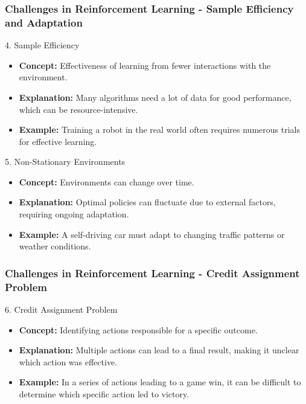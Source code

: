 \documentclass[aspectratio=169]{beamer}
\begin{document}
\begin{frame}[fragile]
    \frametitle{Challenges in Reinforcement Learning - Sample Efficiency and Adaptation}
    \begin{block}{4. Sample Efficiency}
        \begin{itemize}
            \item \textbf{Concept:} Effectiveness of learning from fewer interactions with the environment.
            \item \textbf{Explanation:} Many algorithms need a lot of data for good performance, which can be resource-intensive.
            \item \textbf{Example:} Training a robot in the real world often requires numerous trials for effective learning.
        \end{itemize}
    \end{block}

    \begin{block}{5. Non-Stationary Environments}
        \begin{itemize}
            \item \textbf{Concept:} Environments can change over time.
            \item \textbf{Explanation:} Optimal policies can fluctuate due to external factors, requiring ongoing adaptation.
            \item \textbf{Example:} A self-driving car must adapt to changing traffic patterns or weather conditions.
        \end{itemize}
    \end{block}
\end{frame}

\begin{frame}[fragile]
    \frametitle{Challenges in Reinforcement Learning - Credit Assignment Problem}
    \begin{block}{6. Credit Assignment Problem}
        \begin{itemize}
            \item \textbf{Concept:} Identifying actions responsible for a specific outcome.
            \item \textbf{Explanation:} Multiple actions can lead to a final result, making it unclear which action was effective.
            \item \textbf{Example:} In a series of actions leading to a game win, it can be difficult to determine which specific action led to victory.
        \end{itemize}
    \end{block}
\end{frame}
\end{document}

